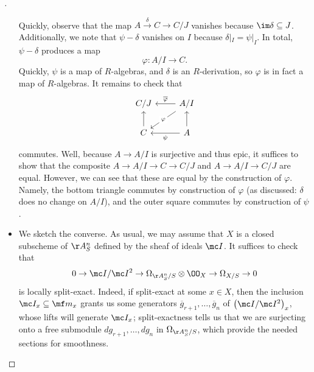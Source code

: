 \documentclass[../notes.tex]{subfiles}
\begin{document}
\begin{proof}[]
\begin{itemize}
		Quickly, observe that the map $A\stackrel\delta\to C\to C/J$ vanishes because $\im\delta\subseteq J$. Additionally, we note that $\psi-\delta$ vanishes on $I$ because $\delta|_I=\psi|_I$. In total, $\psi-\delta$ produces a map
		\[\varphi\colon A/I\to C.\]
		Quickly, $\psi$ is a map of $R$-algebras, and $\delta$ is an $R$-derivation, so $\varphi$ is in fact a map of $R$-algebras. It remains to check that
		\[\begin{tikzcd}
			{C/J} & {A/I} \\
			C & A
			\arrow["\overline\varphi"', from=1-2, to=1-1]
			\arrow[from=2-1, to=1-1]
			\arrow["\varphi"{description}, from=1-2, to=2-1]
			\arrow[from=2-2, to=1-2]
			\arrow["\psi", from=2-2, to=2-1]
		\end{tikzcd}\]
		commutes. Well, because $A\to A/I$ is surjective and thus epic, it suffices to show that the composite $A\to A/I\to C\to C/J$ and $A\to A/I\to C/J$ are equal. However, we can see that these are equal by the construction of $\varphi$. Namely, the bottom triangle commutes by construction of $\varphi$ (as discussed: $\delta$ does no change on $A/I$), and the outer square commutes by construction of $\psi$.
		\item We sketch the converse. As usual, we may assume that $X$ is a closed subscheme of $\AA^n_S$ defined by the sheaf of ideals $\mc I$. It suffices to check that
		\[0\to\mc I/\mc I^2\to\Omega_{\AA^n_S/S}\otimes\OO_X\to\Omega_{X/S}\to0\]
		is locally split-exact. Indeed, if split-exact at some $x\in X$, then the inclusion $\mc I_x\subseteq\mf m_x$ grants us some generators $\overline g_{r+1},\ldots,\overline g_n$ of $\left(\mc I/\mc I^2\right)_x$, whose lifts will generate $\mc I_x$; split-exactness tells us that we are surjecting onto a free submodule $dg_{r+1},\ldots,dg_n$ in $\Omega_{\AA^n_S/S}$, which provide the needed sections for smoothness.


\end{itemize}
\end{proof}
\end{document}
